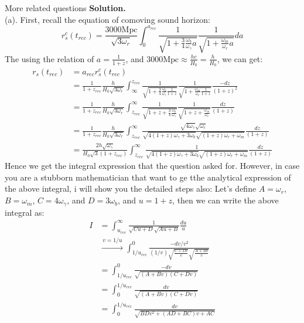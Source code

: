 \begin{example}{More related questions}{}
    \bigskip\textbf{Solution.}\quad \\
    (a). First, recall the equation of comoving sound horizon:
    \[
         r_s^c(t_{rec}) =  \frac{3000 \text{Mpc}}{\sqrt{3 \omega_{r}}} \int_0^{a_{rec}} \frac{1}{\sqrt{1 + \frac{3}{4} \frac{\omega_b}{\omega_\gamma} a}} \frac{1}{\sqrt{1 + \frac{\omega_{m}}{\omega_{r}} a}} da
    \]
    The using the relation of $a = \frac{1}{1+z}$, and $ 3000 \text{Mpc} \approx \frac{h c}{H_0} = \frac{h}{H_0}$, we can get:
    \begin{align*}
        r_s(t_{rec}) &= a_{rec} r_s^c(t_{rec}) \\
        &= \frac{1}{1+z_{rec}} \frac{h}{H_0 \sqrt{3 \omega_{r}}} \int_\infty^{z_{rec}} \frac{1}{\sqrt{1 + \frac{3}{4} \frac{\omega_b}{\omega_\gamma} \frac{1}{1+z}}} \frac{1}{\sqrt{1 + \frac{\omega_{m}}{\omega_{r}} \frac{1}{1+z}}} \frac{-dz}{(1+z)^2} \\
        &= \frac{1}{1+z_{rec}} \frac{h}{H_0 \sqrt{3 \omega_{r}}} \int_{z_{rec}}^\infty \frac{1}{\sqrt{1 + z + \frac{3}{4} \frac{\omega_b}{\omega_\gamma}}} \frac{1}{\sqrt{1 + z + \frac{\omega_{m}}{\omega_{r}}}} \frac{dz}{(1+z)} \\
        &= \frac{1}{1+z_{rec}} \frac{h}{H_0 \sqrt{3 \omega_{r}}} \int_{z_{rec}}^\infty \frac{\sqrt{4 \omega_\gamma} \sqrt{\omega_r}}{\sqrt{4(1 + z) \omega_{\gamma} + 3 \omega_b} \sqrt{(1 + z) \omega_{r} + \omega_{m}}} \frac{dz}{(1+z)}\\
        &= \frac{2 h \sqrt{\omega_\gamma}}{H_0 \sqrt{3} (1+z_{rec})} \int_{z_{rec}}^\infty \frac{1}{\sqrt{4(1 + z) \omega_{\gamma} + 3 \omega_b} \sqrt{(1 + z) \omega_{r} + \omega_{m}}} \frac{dz}{(1+z)}
    \end{align*}
    Hence we get the integral expression that the question asked for. However, in case you are a stubborn mathematician that want to ge tthe analytical expression of the above integral, i will show you the detailed steps also:
    Let's define $A = \omega_r$, $B = \omega_m$, $C = 4 \omega_\gamma$, and $D = 3 \omega_b$, and $u = 1 + z$, then we can write the above integral as:
    \small
    \begin{align*}
        I &= \int_{u_{rec}}^\infty \frac{1}{\sqrt{C u + D} \sqrt{A u + B}} \frac{du}{u} \\
        &\xrightarrow{\,v=1/u\,} \int_{1/u_{rec}}^0 \frac{-dv/v^2}{(1/v)\sqrt{\frac{C + Dv}{v}}\sqrt{\frac{A + Bv}{v}}} \\
        &= \int_{1/u_{rec}}^0 \frac{-dv}{\sqrt{(A + Bv)(C + Dv)}} \\
        &= \int_{0}^{1/u_{rec}} \frac{dv}{\sqrt{(A + Bv)(C + Dv)}} \\
        &= \int_{0}^{1/u_{rec}} \frac{dv}{\sqrt{BD v^2 + (AD + BC)v + AC}}
    \end{align*}
    \normalsize


\end{example}
